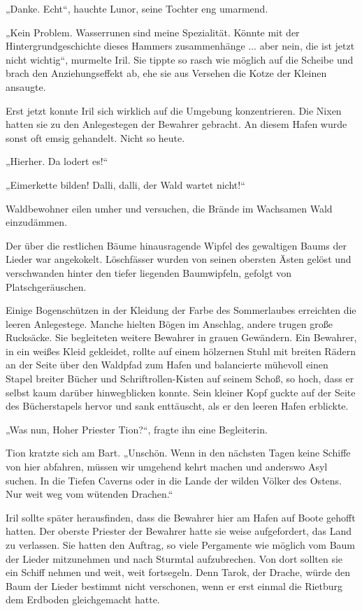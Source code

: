 „Danke. Echt“, hauchte Lunor, seine Tochter eng umarmend.

„Kein Problem. Wasserrunen sind meine Spezialität. Könnte mit der Hintergrundgeschichte dieses Hammers zusammenhänge ... aber nein, die ist jetzt nicht wichtig“, murmelte Iril. Sie tippte so rasch wie möglich auf die Scheibe und brach den Anziehungseffekt ab, ehe sie aus Versehen die Kotze der Kleinen ansaugte.

Erst jetzt konnte Iril sich wirklich auf die Umgebung konzentrieren. Die Nixen hatten sie zu den Anlegestegen der Bewahrer gebracht. An diesem Hafen wurde sonst oft emsig gehandelt. Nicht so heute.

„Hierher. Da lodert es!“

„Eimerkette bilden! Dalli, dalli, der Wald wartet nicht!“

Waldbewohner eilen umher und versuchen, die Brände im Wachsamen Wald einzudämmen.

Der über die restlichen Bäume hinausragende Wipfel des gewaltigen Baums der Lieder war angekokelt. Löschfässer wurden von seinen obersten Ästen gelöst und verschwanden hinter den tiefer liegenden Baumwipfeln, gefolgt von Platschgeräuschen.

Einige Bogenschützen in der Kleidung der Farbe des Sommerlaubes erreichten die leeren Anlegestege. Manche hielten Bögen im Anschlag, andere trugen große Rucksäcke. Sie begleiteten weitere Bewahrer in grauen Gewändern. Ein Bewahrer, in ein weißes Kleid gekleidet, rollte auf einem hölzernen Stuhl mit breiten Rädern an der Seite über den Waldpfad zum Hafen und balancierte mühevoll einen Stapel breiter Bücher und Schriftrollen-Kisten auf seinem Schoß, so hoch, dass er selbst kaum darüber hinwegblicken konnte. Sein kleiner Kopf guckte auf der Seite des Bücherstapels hervor und sank enttäuscht, als er den leeren Hafen erblickte.

„Was nun, Hoher Priester Tion?“, fragte ihn eine Begleiterin.

Tion kratzte sich am Bart. „Unschön. Wenn in den nächsten Tagen keine Schiffe von hier abfahren, müssen wir umgehend kehrt machen und anderswo Asyl suchen. In die Tiefen Caverns oder in die Lande der wilden Völker des Ostens. Nur weit weg vom wütenden Drachen.“

Iril sollte später herausfinden, dass die Bewahrer hier am Hafen auf Boote gehofft hatten. Der oberste Priester der Bewahrer hatte sie weise aufgefordert, das Land zu verlassen. Sie hatten den Auftrag, so viele Pergamente wie möglich vom Baum der Lieder mitzunehmen und nach Sturmtal aufzubrechen. Von dort sollten sie ein Schiff nehmen und weit, weit fortsegeln. Denn Tarok, der Drache, würde den Baum der Lieder bestimmt nicht verschonen, wenn er erst einmal die Rietburg dem Erdboden gleichgemacht hatte.

